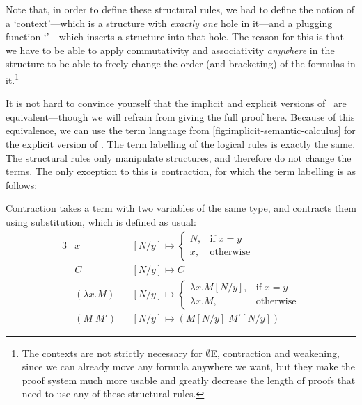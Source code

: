 Note that, in order to define these structural rules, we had to define
the notion of a `context'---which is a structure with \emph{exactly
one} hole in it---and a plugging function `\plug'---which inserts a
structure into that hole. The reason for this is that we have to be
able to apply commutativity and associativity \emph{anywhere} in the
structure to be able to freely change the order (and bracketing) of
the formulas in it.\footnote{%
  The contexts are not strictly necessary for $\emptyset$E,
  contraction and weakening, since we can already move any formula
  anywhere we want, but they make the proof system much more usable
  and greatly decrease the length of proofs that need to use any of
  these structural rules.
}

It is not hard to convince yourself that the implicit and explicit
versions of \lamET\ are equivalent---though we will refrain from
giving the full proof here.
Because of this equivalence, we can use the term language from
\autoref{fig:implicit-semantic-calculus} for the explicit version of
\lamET.
The term labelling of the logical rules is exactly the same. The
structural rules only manipulate structures, and therefore do not
change the terms. The only exception to this is contraction, for which
the term labelling is as follows:
\begin{prooftree}
\end{prooftree}
Contraction takes a term with two variables of the same type, and
contracts them using substitution, which is defined as usual:
\begin{alignat*}{3}
  &x             &&[N/y] \mapsto
  \begin{cases}
    N, &\text{if}\;x=y\\
    x, &\text{otherwise}
  \end{cases}
  \\
  &C             &&[N/y] \mapsto C\\
  &(\lambda x.M) &&[N/y] \mapsto
  \begin{cases}
    \lambda x.M[N/y], &\text{if}\;x=y\\
    \lambda x.M,      &\text{otherwise}
  \end{cases}
  \\
  &(M\;M')       &&[N/y] \mapsto (M[N/y]\;M'[N/y])
\end{alignat*}

